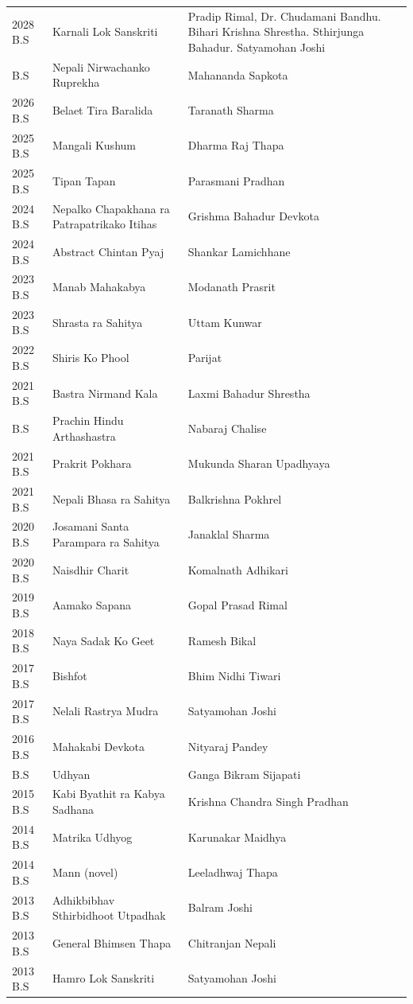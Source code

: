 \documentclass[
]{book}
\begin{document}
\begin{longtable}[t]{l>{\raggedright\arraybackslash}p{14em}>{\raggedright\arraybackslash}p{24em}}
\rowcolor{gray!6}  2028 B.S & Karnali Lok Sanskriti & Pradip Rimal, Dr. Chudamani Bandhu. Bihari Krishna Shrestha. Sthirjunga Bahadur. Satyamohan Joshi\\
\addlinespace
2027 B.S & Nepali Nirwachanko Ruprekha & Mahananda Sapkota\\
\rowcolor{gray!6}  2026 B.S & Belaet Tira Baralida & Taranath Sharma\\
2025 B.S & Mangali Kushum & Dharma Raj Thapa\\
\rowcolor{gray!6}  2025 B.S & Tipan Tapan & Parasmani Pradhan\\
2024 B.S & Nepalko Chapakhana ra Patrapatrikako Itihas & Grishma Bahadur Devkota\\
\addlinespace
\rowcolor{gray!6}  2024 B.S & Abstract Chintan Pyaj & Shankar Lamichhane\\
2023 B.S & Manab Mahakabya & Modanath Prasrit\\
\rowcolor{gray!6}  2023 B.S & Shrasta ra Sahitya & Uttam Kunwar\\
2022 B.S & Shiris Ko Phool & Parijat\\
\rowcolor{gray!6}  2021 B.S & Bastra Nirmand Kala & Laxmi Bahadur Shrestha\\
\addlinespace
2021 B.S & Prachin Hindu Arthashastra & Nabaraj Chalise\\
\rowcolor{gray!6}  2021 B.S & Prakrit Pokhara & Mukunda Sharan Upadhyaya\\
2021 B.S & Nepali Bhasa ra Sahitya & Balkrishna Pokhrel\\
\rowcolor{gray!6}  2020 B.S & Josamani Santa Parampara ra Sahitya & Janaklal Sharma\\
2020 B.S & Naisdhir Charit & Komalnath Adhikari\\
\addlinespace
\rowcolor{gray!6}  2019 B.S & Aamako Sapana & Gopal Prasad Rimal\\
2018 B.S & Naya Sadak Ko Geet & Ramesh Bikal\\
\rowcolor{gray!6}  2017 B.S & Bishfot & Bhim Nidhi Tiwari\\
2017 B.S & Nelali Rastrya Mudra & Satyamohan Joshi\\
\rowcolor{gray!6}  2016 B.S & Mahakabi Devkota & Nityaraj Pandey\\
\addlinespace
2015 B.S & Udhyan & Ganga Bikram Sijapati\\
\rowcolor{gray!6}  2015 B.S & Kabi Byathit ra Kabya Sadhana & Krishna Chandra Singh Pradhan\\
2014 B.S & Matrika Udhyog & Karunakar Maidhya\\
\rowcolor{gray!6}  2014 B.S & Mann (novel) & Leeladhwaj Thapa\\
2013 B.S & Adhikbibhav Sthirbidhoot Utpadhak & Balram Joshi\\
\addlinespace
\rowcolor{gray!6}  2013 B.S & General Bhimsen Thapa & Chitranjan Nepali\\
2013 B.S & Hamro Lok Sanskriti & Satyamohan Joshi\\
\bottomrule
\end{longtable}
\endgroup{}
\end{document}
